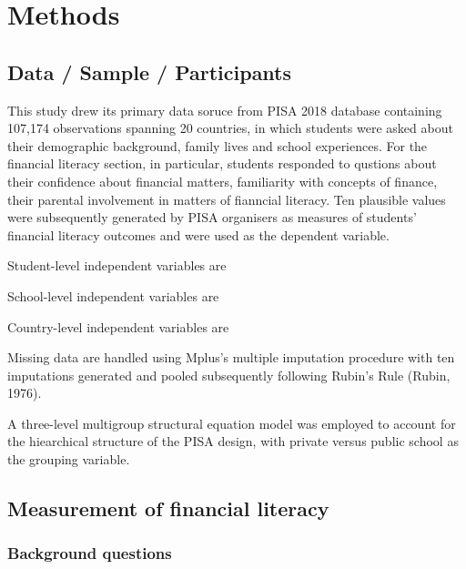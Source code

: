 \documentclass[a4paper,11pt,UKenglish,twoside,openright]{report}\usepackage[]{graphicx}\usepackage[]{color}
\begin{document}
\newpage



\newpage



\newpage




\chapter{Methods}
\label{chp:3}

\section{Data / Sample / Participants}

This study drew its primary data soruce from PISA 2018 database \parencite{FLdata} containing 107,174 observations spanning 20 countries, in which students were asked about their demographic background, family lives and school experiences. For the financial literacy section, in particular, students responded to qustions about their confidence about financial matters, familiarity with concepts of finance, their parental involvement in matters of fianncial literacy. Ten plausible values were subsequently generated by PISA organisers as measures of students' financial literacy outcomes and were used as the dependent variable.

Student-level independent variables are

School-level independent variables are

Country-level independent variables are

Missing data are handled using Mplus's multiple imputation procedure with ten imputations generated and pooled subsequently following Rubin's Rule (Rubin, 1976).

A three-level multigroup structural equation model was employed to account for the hiearchical structure of the PISA design, with private versus public school as the grouping variable.

\section{Measurement of financial literacy}

\subsection{Background questions}
\end{document}
